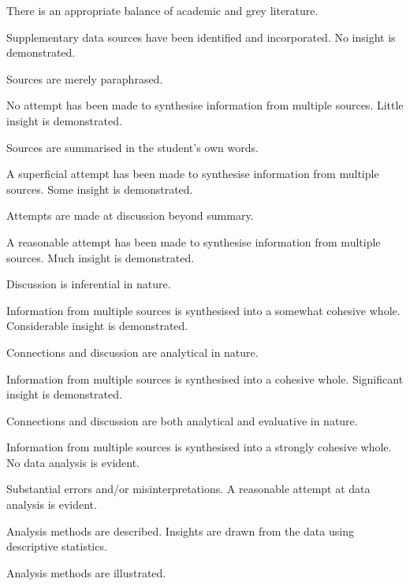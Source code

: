 \documentclass{../../fal_assignment}
\begin{document}
\begin{markingrubric}
        \par			There is an appropriate balance of academic and grey literature.
        \par			Supplementary data sources have been identified and incorporated.
%
        \grade\fail 	No insight is demonstrated.
        \par			Sources are merely paraphrased.
        \par 			No attempt has been made to synthesise information from multiple sources.
        \grade		Little insight is demonstrated.
        \par			Sources are summarised in the student's own words.
        \par 			A superficial attempt has been made to synthesise information from multiple sources.
        \grade		Some insight is demonstrated.
        \par			Attempts are made at discussion beyond summary.
        \par 			A reasonable attempt has been made to synthesise information from multiple sources.
        \grade		Much insight is demonstrated.
        \par			Discussion is inferential in nature.
        \par 			Information from multiple sources is synthesised into a somewhat cohesive whole.
        \grade		Considerable insight is demonstrated.
        \par			Connections and discussion are analytical in nature.
        \par 			Information from multiple sources is synthesised into a cohesive whole.
        \grade		Significant insight is demonstrated.
        \par			Connections and discussion are both analytical and evaluative in nature.
        \par 			Information from multiple sources is synthesised into a strongly cohesive whole.
%
        \grade\fail 	No data analysis is evident.
        \par 			Substantial errors and/or misinterpretations.
        \grade 		A reasonable attempt at data analysis is evident.
        \par 			Analysis methods are described.
        \grade 		Insights are drawn from the data using descriptive statistics.
        \par 			Analysis methods are illustrated.

\end{markingrubric}
\end{document}
